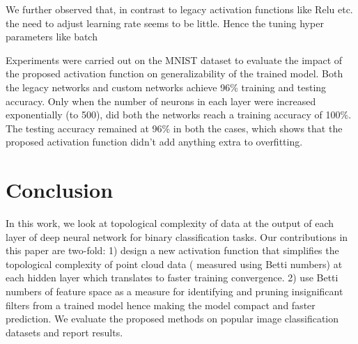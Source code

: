 \documentclass{bmvc2k}
\begin{document}
We further observed that,  in contrast to legacy activation functions like Relu etc. the need to adjust learning rate seems to be little. Hence the tuning hyper parameters like batch

Experiments were carried out on the MNIST dataset  to evaluate the impact of the proposed activation function on generalizability of the trained model. Both the legacy networks and custom networks achieve 96\% training and testing accuracy.
Only when the number of neurons in each layer were increased exponentially (to 500), did both the networks reach a training accuracy of 100\%. The testing accuracy remained at 96\% in both the cases, which shows that the proposed activation function didn’t add anything extra to overfitting.

\section{Conclusion}
In this work, we look at topological complexity of data at the output of each layer of deep neural network for binary classification tasks. Our contributions in this paper are two-fold: 1) design a new activation function that simplifies the topological complexity of point cloud data ( measured using Betti numbers)  at each hidden layer which translates to faster training convergence. 2) use Betti numbers  of feature space as a measure  for identifying and  pruning insignificant filters from a trained model hence making the model compact and faster prediction. We evaluate the proposed methods on popular image classification datasets and report results.






\end{document}
